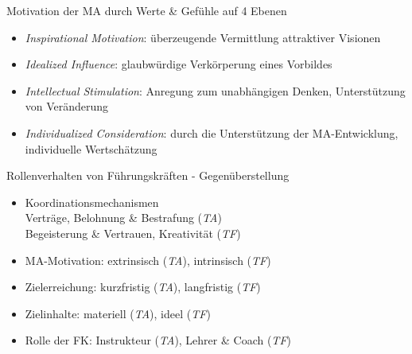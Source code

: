 \documentclass{cheatsheet}
\begin{document}
    \begin{warningbox}{Motivation der MA durch Werte \& Gefühle auf 4 Ebenen}
        \begin{itemize}
            \item \emph{Inspirational Motivation}: überzeugende Vermittlung attraktiver Visionen
            \item \emph{Idealized Influence}: glaubwürdige Verkörperung eines Vorbildes
            \item \emph{Intellectual Stimulation}: Anregung zum unabhängigen Denken, Unterstützung von Veränderung
            \item \emph{Individualized Consideration}: durch die Unterstützung der MA-Entwicklung, individuelle Wertschätzung
        \end{itemize}
    \end{warningbox}
    \begin{hintbox}{Rollenverhalten von Führungskräften - Gegenüberstellung}
        \begin{itemize}
            \item Koordinationsmechanismen\\
            \ra Verträge, Belohnung \& Bestrafung (\emph{TA})\\
            \ra Begeisterung \& Vertrauen, Kreativität (\emph{TF})
            \item MA-Motivation: extrinsisch (\emph{TA}), intrinsisch (\emph{TF})
            \item Zielerreichung: kurzfristig (\emph{TA}), langfristig (\emph{TF})
            \item Zielinhalte: materiell (\emph{TA}), ideel (\emph{TF})
            \item Rolle der FK: Instrukteur (\emph{TA}), Lehrer \& Coach (\emph{TF})
        \end{itemize}
    \end{hintbox}
\end{document}
